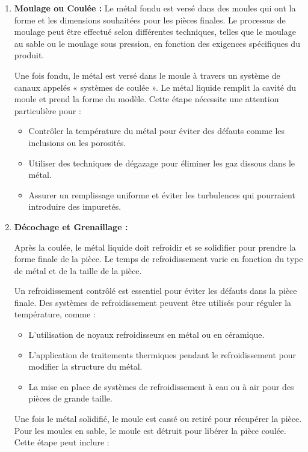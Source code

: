 \documentclass[12pt]{article}
\begin{document}
\begin{enumerate}
    \item \textbf{Moulage ou Coulée :} Le métal fondu est versé dans des moules qui ont la 
    forme et les dimensions souhaitées pour les pièces finales. Le processus de 
    moulage peut être effectué selon différentes techniques, telles que le moulage 
    au sable ou le moulage sous pression, en fonction des exigences spécifiques du 
    produit.


    Une fois fondu, le métal est versé dans le moule à travers un système de canaux appelés « systèmes de coulée ». Le métal liquide remplit la cavité du moule et prend la forme du modèle. Cette étape nécessite une attention particulière pour :

\begin{itemize}
    \item Contrôler la température du métal pour éviter des défauts comme les inclusions ou les porosités.
    \item Utiliser des techniques de dégazage pour éliminer les gaz dissous dans le métal.
    \item Assurer un remplissage uniforme et éviter les turbulences qui pourraient introduire des impuretés.
\end{itemize}

    \item \textbf{Décochage et Grenaillage :} 

    Après la coulée, le métal liquide doit refroidir et se solidifier pour prendre la forme finale de la pièce. Le temps de refroidissement varie en fonction du type de métal et de la taille de la pièce.

    Un refroidissement contrôlé est essentiel pour éviter les défauts dans la pièce finale. Des systèmes de refroidissement peuvent être utilisés pour réguler la température, comme :

    \begin{itemize}
        \item L'utilisation de noyaux refroidisseurs en métal ou en céramique.
        \item L'application de traitements thermiques pendant le refroidissement pour modifier la structure du métal.
        \item La mise en place de systèmes de refroidissement à eau ou à air pour des pièces de grande taille.
    \end{itemize}

    
    Une fois le métal solidifié, le moule est cassé ou retiré pour récupérer la pièce. Pour les moules en sable, le moule est détruit pour libérer la pièce coulée. Cette étape peut inclure :


\end{enumerate}
\end{document}
